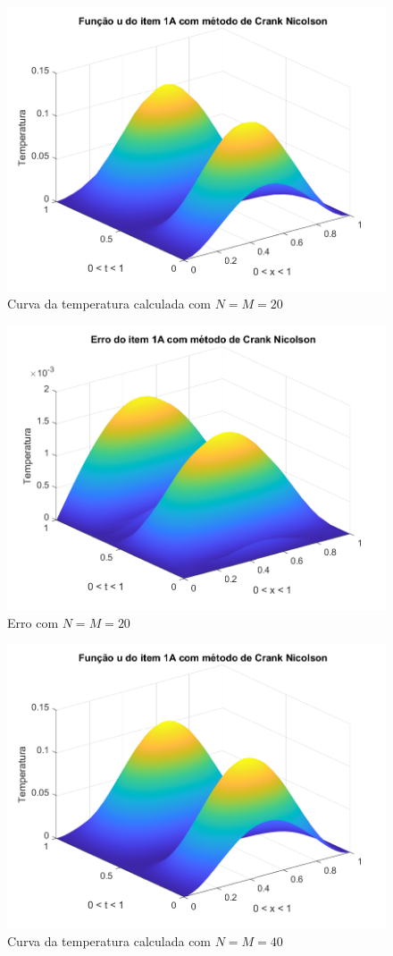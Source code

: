 \documentclass[12pt]{article}
\begin{document}
\begin{spacing}{1.5}
\begin{figure}
    \centering
    \includegraphics[width=0.8\linewidth]{Segunda_Tarefa/ItemC/nm20_calculada_A.png}
    \caption{Curva da temperatura calculada com $N=M=20$}
    \label{fig:CA_nm20_calculada}
\end{figure}

\begin{figure}
    \centering
    \includegraphics[width=0.8\linewidth]{Segunda_Tarefa/ItemC/nm20_erro_A.png}
    \caption{Erro com $N=M=20$}
    \label{fig:CA_nm20_erro}
\end{figure}

\begin{figure}
    \centering
    \includegraphics[width=0.8\linewidth]{Segunda_Tarefa/ItemC/nm40_calculada_A.png}
    \caption{Curva da temperatura calculada com $N=M=40$}
    \label{fig:CA_nm40_calculada}
\end{figure}


\end{spacing}
\end{document}
